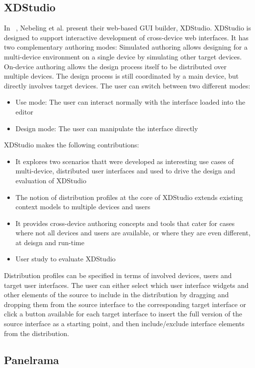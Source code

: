 \subsection{XDStudio}

In ~\cite{xdstudio2014}, Nebeling et al. present their web-based GUI builder, XDStudio. XDStudio is designed to support interactive development of cross-device web interfaces. It has two complementary authoring modes: Simulated authoring allows designing for a multi-device environment on a single device by simulating other target devices. On-device authoring allows the design process itself to be distributed over multiple devices. The design process is still coordinated by a main device, but directly involves target devices. The user can switch between two different modes:
\begin{itemize}
	\item Use mode: The user can interact normally with the interface loaded into the editor
	\item Design mode: The user can manipulate the interface directly
\end{itemize}
XDStudio makes the following contributions:
\begin{itemize}
	\item It explores two scenarios thatt were developed as interesting use cases of multi-device, distributed user interfaces and used to drive the design and evaluation of XDStudio
	\item The notion of distribution profiles at the core of XDStudio extends existing context models to multiple devices and users
	\item It provides cross-device authoring concepts and tools that cater for cases where not all devices and users are available, or where they are even different, at deisgn and run-time
	\item User study to evaluate XDStudio
\end{itemize}
Distribution profiles can be specified in terms of involved devices, users and target user interfaces. The user can either select which user interface widgets and other elements of the source to include in the distribution by dragging and dropping them from the source interface to the corresponding target interface or click a button available for each target interface to insert the full version of the source interface as a starting point, and then include/exclude interface elements from the distribution.

\subsection{Panelrama}

